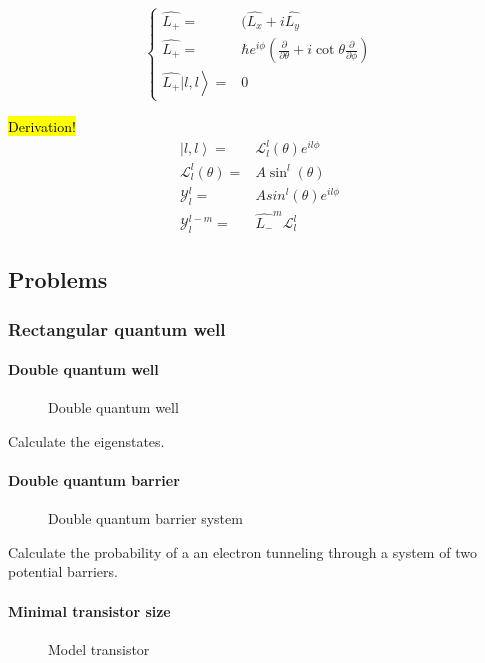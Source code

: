 			\begin{align}
				\left\{ \begin{aligned}
					\hat{L_+} =& (\hat{L_x} +i\hat{L_y}\\
					\hat{L_+} =& \hbar e^{i\phi}\left(\frac{\partial}{\partial \theta} + i\cot{\theta}\frac{\partial}{\partial \phi}\right) \\
					\left. \hat{L_+}|l,l\right\rangle =& 0
				\end{aligned} \right.
			\end{align}
			
			\hl{Derivation!}
			\begin{align}
				\left|l,l\right\rangle =& \mathcal{L}_l^l (\theta) e^{il\phi} \\
				\mathcal{L}_l^l (\theta) =& A\sin^l (\theta) \\
				\mathcal{Y}_l^l =& Asin^l(\theta)e^{il\phi}\\
				\mathcal{Y}_l^{l-m} =& \hat{L_-}^m\mathcal{L}_l^l
			\end{align}
			
	\newpage
	\subsection{Problems}
		\subsubsection{Rectangular quantum well}
			\paragraph{Double quantum well}
				\begin{figure}[!h]
					\centering
					
					\caption{Double quantum well}
				\end{figure}
				
				Calculate the eigenstates.
			\paragraph{Double quantum barrier}
				\begin{figure}[!h]
					\centering
					
					\caption{Double quantum barrier system}
				\end{figure}
				
				Calculate the probability of a an electron tunneling through a system of two potential barriers.			
			\paragraph{Minimal transistor size}
				\begin{figure}[!h]
					\centering
					
					\caption{Model transistor}
				\end{figure}
							
